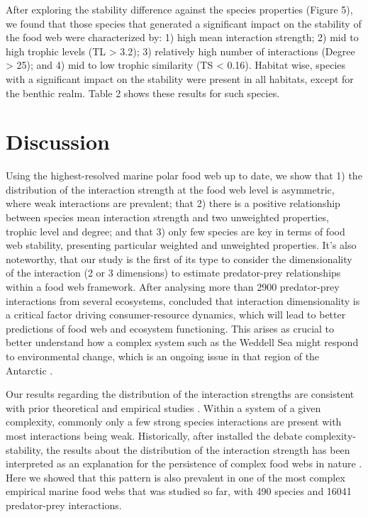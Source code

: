\documentclass[gc, manuscript]{copernicus}
\begin{document}
After exploring the stability difference against the species properties
(Figure 5), we found that those species that generated a significant
impact on the stability of the food web were characterized by: 1) high
mean interaction strength; 2) mid to high trophic levels (TL
\textgreater{} 3.2); 3) relatively high number of interactions (Degree
\textgreater{} 25); and 4) mid to low trophic similarity (TS \textless{}
0.16). Habitat wise, species with a significant impact on the stability
were present in all habitats, except for the benthic realm. Table 2
shows these results for such species.

\section{Discussion}

Using the highest-resolved marine polar food web up to date, we show
that 1) the distribution of the interaction strength at the food web
level is asymmetric, where weak interactions are prevalent; that 2)
there is a positive relationship between species mean interaction
strength and two unweighted properties, trophic level and degree; and
that 3) only few species are key in terms of food web stability,
presenting particular weighted and unweighted properties. It's also
noteworthy, that our study is the first of its type to consider the
dimensionality of the interaction (2 or 3 dimensions) to estimate
predator-prey relationships within a food web framework. After analysing
more than 2900 predator-prey interactions from several ecosystems,
\citet{Pawar2012} concluded that interaction dimensionality is a
critical factor driving consumer-resource dynamics, which will lead to
better predictions of food web and ecosystem functioning. This arises as
crucial to better understand how a complex system such as the Weddell
Sea might respond to environmental change, which is an ongoing issue in
that region of the Antarctic \citep[ and references herein]{Gutt2022}.

Our results regarding the distribution of the interaction strengths are
consistent with prior theoretical and empirical studies
\citep[e.g.][]{McCann1998, Neutel2002, Emmerson2004, Wootton2005}.
Within a system of a given complexity, commonly only a few strong
species interactions are present with most interactions being weak.
Historically, after \citet{May1972} installed the debate
complexity-stability, the results about the distribution of the
interaction strength has been interpreted as an explanation for the
persistence of complex food webs in nature
\citep{Bascompte2005, Allesina2015, Nilsson2016}. Here we showed that
this pattern is also prevalent in one of the most complex empirical
marine food webs that was studied so far, with 490 species and 16041
predator-prey interactions.
\end{document}
